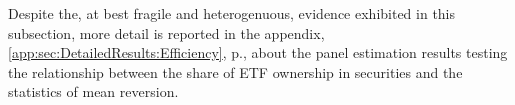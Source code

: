 \bigskip
Despite the, at best fragile and heterogenuous, evidence exhibited in this subsection, more detail is reported in the appendix, \autoref{app:sec:DetailedResults:Efficiency}, p.\pageref{app:sec:DetailedResults:Efficiency}, about the panel estimation results testing the relationship between the share of ETF ownership in securities and the statistics of mean reversion.

\begin{landscape}
  {\linespread{1.0}
    \begin{table}[htbp]
      
    \end{table}
  }
\end{landscape}
